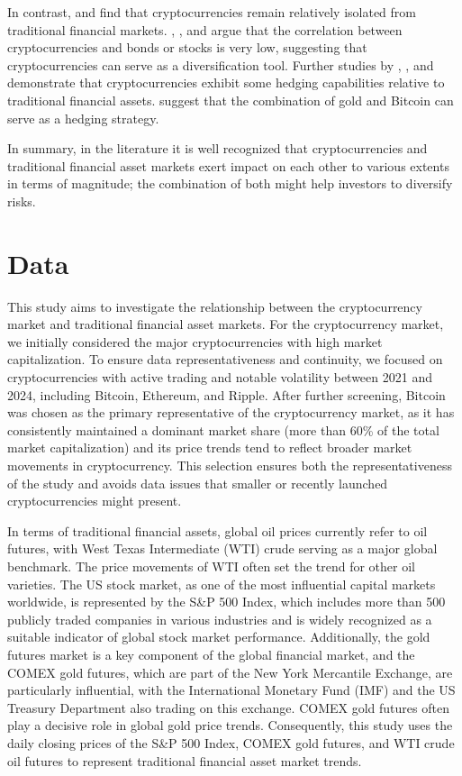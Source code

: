 \documentclass{article}
\begin{document}
In contrast, \cite{corbet2019cryptocurrencies} and \cite{baur2018b} find that cryptocurrencies remain relatively isolated from traditional financial markets. \cite{baur2018b}, \cite{briere2015virtual}, and \cite{bouri2018bitcoin} argue that the correlation between cryptocurrencies and bonds or stocks is very low, suggesting that cryptocurrencies can serve as a diversification tool. Further studies by \cite{dyhrberg2016b}, \cite{bouri2018bitcoin}, and \cite{bencheikh2020asymmetric} demonstrate that cryptocurrencies exhibit some hedging capabilities relative to traditional financial assets. \cite{yermack2015} suggest that the combination of gold and Bitcoin can serve as a hedging strategy.




In summary, in the literature it is well recognized that cryptocurrencies and traditional financial asset markets exert impact on each other to various extents in terms of magnitude; the combination of both might help investors to diversify risks. 



\section{Data}


This study aims to investigate the relationship between the cryptocurrency market and traditional financial asset markets. For the cryptocurrency market, we initially considered the major cryptocurrencies with high market capitalization. To ensure data representativeness and continuity, we focused on cryptocurrencies with active trading and notable volatility between 2021 and 2024, including Bitcoin, Ethereum, and Ripple. After further screening, Bitcoin was chosen as the primary representative of the cryptocurrency market, as it has consistently maintained a dominant market share (more than 60\% of the total market capitalization) and its price trends tend to reflect broader market movements in cryptocurrency. This selection ensures both the representativeness of the study and avoids data issues that smaller or recently launched cryptocurrencies might present.

In terms of traditional financial assets, global oil prices currently refer to oil futures, with West Texas Intermediate (WTI) crude serving as a major global benchmark. The price movements of WTI often set the trend for other oil varieties. The US stock market, as one of the most influential capital markets worldwide, is represented by the S\&P 500 Index, which includes more than 500 publicly traded companies in various industries and is widely recognized as a suitable indicator of global stock market performance. Additionally, the gold futures market is a key component of the global financial market, and the COMEX gold futures, which are part of the New York Mercantile Exchange, are particularly influential, with the International Monetary Fund (IMF) and the US Treasury Department also trading on this exchange. COMEX gold futures often play a decisive role in global gold price trends. Consequently, this study uses the daily closing prices of the S\&P 500 Index, COMEX gold futures, and WTI crude oil futures to represent traditional financial asset market trends.
 
\end{document}
